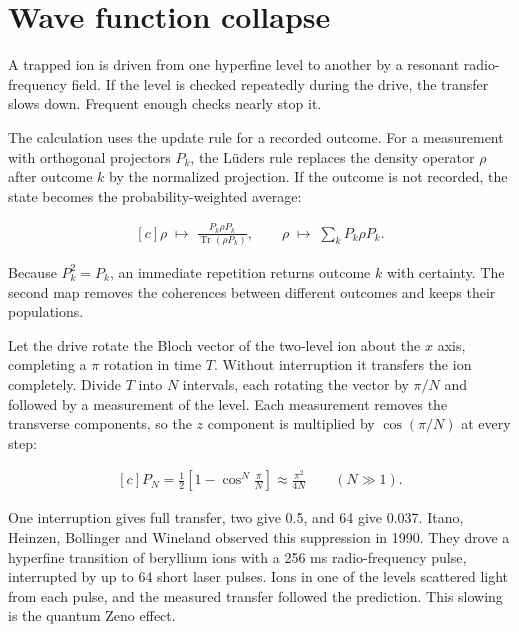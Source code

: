\documentclass[11pt,oneside]{book}
\newenvironment{centeredalign}{\[\begin{gathered}[c]}{\end{gathered}\]}
\begin{document}
\clearpage

\section{Wave function collapse}

\label{topic:wave-function-collapse}

A trapped ion is driven from one hyperfine level to another by a resonant radio-frequency field. If the level is checked repeatedly during the drive, the transfer slows down. Frequent enough checks nearly stop it.

The calculation uses the update rule for a recorded outcome. For a measurement with orthogonal projectors \(P_k\), the Lüders rule replaces the density operator \(\rho\) after outcome \(k\) by the normalized projection. If the outcome is not recorded, the state becomes the probability-weighted average:

\begin{centeredalign}
\rho\;\longmapsto\;\frac{P_k\rho P_k}{\operatorname{Tr}(\rho P_k)},\qquad
\rho\;\longmapsto\;\sum_kP_k\rho P_k.
\end{centeredalign}

Because \(P_k^2=P_k\), an immediate repetition returns outcome \(k\) with certainty. The second map removes the coherences between different outcomes and keeps their populations.

Let the drive rotate the Bloch vector of the two-level ion about the \(x\) axis, completing a \(\pi\) rotation in time \(T\). Without interruption it transfers the ion completely. Divide \(T\) into \(N\) intervals, each rotating the vector by \(\pi/N\) and followed by a measurement of the level. Each measurement removes the transverse components, so the \(z\) component is multiplied by \(\cos(\pi/N)\) at every step:

\begin{centeredalign}
P_N=\frac12\left[1-\cos^N\frac{\pi}{N}\right]\approx\frac{\pi^2}{4N}\qquad(N\gg1).
\end{centeredalign}

One interruption gives full transfer, two give 0.5, and 64 give 0.037. Itano, Heinzen, Bollinger and Wineland observed this suppression in 1990. They drove a hyperfine transition of beryllium ions with a 256 ms radio-frequency pulse, interrupted by up to 64 short laser pulses. Ions in one of the levels scattered light from each pulse, and the measured transfer followed the prediction. This slowing is the quantum Zeno effect.
\end{document}
